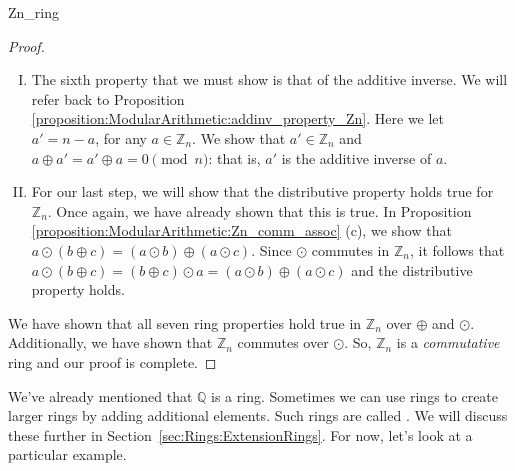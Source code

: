 \begin{example}{Zn_ring}
\begin{proof}
\begin{enumerate}[(I)]
$a \odot b    =  b \odot a$, for all $a,b\in{\mathbb Z}_n$.  Note that for a set to be a ring, we only need to show that commutativity of \emph{addition} holds.  Because commutativity of \emph{multiplication} also holds for ${\mathbb Z}_n$, we may also have a \emph{commutative} ring.  Let's continue with our proof that ${\mathbb Z}_n$ is a ring before we jump to that conclusion.
\item The sixth property that we must show is that of the additive inverse.  We will refer back to Proposition \ref{proposition:ModularArithmetic:addinv_property_Zn}.  Here we let $a' = n-a$, for any $a\in{\mathbb Z}_n$.  We show that $a'\in{\mathbb Z}_n$ and $a \oplus a' = a' \oplus a  = 0 \pmod{ n}$: that is, $a'$ is the additive inverse of $a$.
\item For our last step, we will show that the distributive property holds true for ${\mathbb Z}_n$. Once again, we have already shown that this is true.  In Proposition \ref{proposition:ModularArithmetic:Zn_comm_assoc} (c), we show that $a \odot (b \oplus c)  = (a \odot b)\oplus (a \odot c)$.  Since $\odot$ commutes in ${\mathbb Z}_n$, it follows that $a \odot (b \oplus c)  = (b \oplus c) \odot a= (a \odot b)\oplus (a \odot c)$ and the distributive property holds.
\end{enumerate}
We have shown that all seven ring properties hold true in ${\mathbb Z}_n$ over $\oplus$ and $\odot$. Additionally, we have shown that ${\mathbb Z}_n$ commutes over $\odot$.  So, ${\mathbb Z}_n$ is a \emph{commutative} ring and our proof is complete.
\end{proof}
\end{example}

We've already mentioned that ${\mathbb Q}$ is a ring. Sometimes we can use rings to create larger rings by adding additional elements. Such rings are called . We will discuss these further in Section~\ref{sec:Rings:ExtensionRings}. For now, let's look at a particular example.

